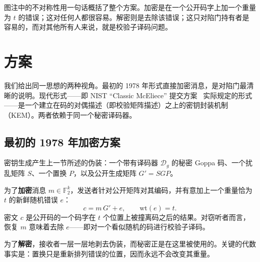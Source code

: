 图注中的不对称性用一句话概括了整个方案。加密是在一个公开码字上加一个重量为 $t$ 的错误；这对任何人都很容易。解密则是去除该错误；这只对陷门持有者是容易的，而对其他所有人来说，就是校验子译码问题。

\section{方案}

我们给出同一思想的两种视角。最初的 1978 年形式直接加密消息，是对陷门最清晰的说明。现代形式——即 NIST “Classic McEliece” 提交方案~\cite{classicmceliece} 实际规定的形式——是一个建立在码的对偶描述（即校验矩阵描述）之上的密钥封装机制（KEM）。两者依赖于同一个秘密译码器。

\subsection{最初的 1978 年加密方案}

密钥生成产生上一节所述的伪装：一个带有译码器 $\mathcal{D}_g$ 的秘密 Goppa 码、一个扰乱矩阵 $S$、一个置换 $P$，以及公开生成矩阵 $G' = SGP$。

为了\textbf{加密}消息 $m \in \mathbb{F}_2^k$，发送者针对公开矩阵对其编码，并有意加上一个重量恰为 $t$ 的新鲜随机错误 $e$：
\[
c = m\,G' + e , \qquad \mathrm{wt}(e) = t .
\]
密文 $c$ 是公开码的一个码字在 $t$ 个位置上被撞离码之后的结果。对窃听者而言，恢复 $m$ 意味着去除 $e$——即对一个看似随机的码进行校验子译码。

为了\textbf{解密}，接收者一层一层地剥去伪装，而秘密正是在这里被使用的。关键的代数事实是：置换只是重新排列错误的位置，因而永远不会改变其重量。

